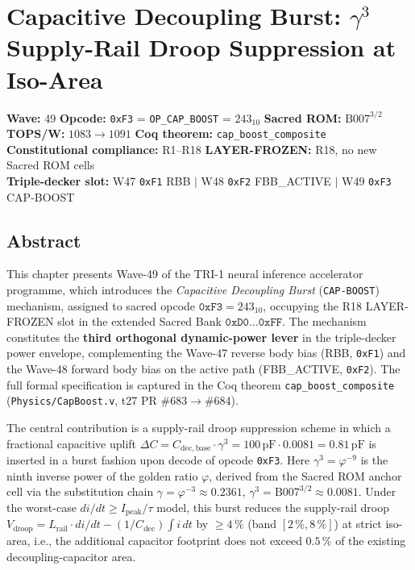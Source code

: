 \documentclass[12pt,a4paper]{report}
\theoremstyle{plain}
\theoremstyle{definition}
\theoremstyle{remark}
\newcommand{\Vdroop}{V_{\mathrm{droop}}}
\newcommand{\Lrail}{L_{\mathrm{rail}}}
\newcommand{\Cdec}{C_{\mathrm{dec}}}
\newcommand{\Cbase}{C_{\mathrm{dec,base}}}
\newcommand{\deltaC}{\Delta C}
\newcommand{\Ipeak}{I_{\mathrm{peak}}}
\newcommand{\Bseven}{\mathrm{B007}}
\begin{document}
\chapter{Capacitive Decoupling Burst: $\gamma^{3}$ Supply-Rail
  Droop Suppression at Iso-Area}
\label{ch:cap-boost-w49}

\noindent\textbf{Wave:} 49 \quad
\textbf{Opcode:} \texttt{0xF3} = \texttt{OP\_CAP\_BOOST} = $243_{10}$\quad
\textbf{Sacred ROM:} $\Bseven^{3/2}$\quad
\textbf{TOPS/W:} $1083 \to 1091$\quad
\textbf{Coq theorem:} \texttt{cap\_boost\_composite}\\[2pt]
\noindent\textbf{Constitutional compliance:} R1--R18 \quad
\textbf{LAYER-FROZEN:} R18, no new Sacred ROM cells\\[2pt]
\noindent\textbf{Triple-decker slot:} W47 \texttt{0xF1} RBB
  $|$ W48 \texttt{0xF2} FBB\_ACTIVE $|$ W49 \texttt{0xF3} CAP-BOOST

\vspace{1em}

\section{Abstract}
\label{sec:abstract-w49}

This chapter presents Wave-49 of the TRI-1 neural inference accelerator
programme, which introduces the \emph{Capacitive Decoupling Burst}
(\texttt{CAP-BOOST}) mechanism, assigned to sacred opcode
$\texttt{0xF3} = 243_{10}$, occupying the R18 LAYER-FROZEN slot in the
extended Sacred Bank $\texttt{0xD0}\ldots\texttt{0xFF}$.
The mechanism constitutes the \textbf{third orthogonal dynamic-power lever}
in the triple-decker power envelope, complementing the Wave-47 reverse body
bias (RBB, \texttt{0xF1}) and the Wave-48 forward body bias on the active
path (FBB\_ACTIVE, \texttt{0xF2}).
The full formal specification is captured in the Coq theorem
\texttt{cap\_boost\_composite} (\texttt{Physics/CapBoost.v}, t27 PR \#683$\to$\#684).

The central contribution is a supply-rail droop suppression scheme in which a
fractional capacitive uplift
$\deltaC = \Cbase \cdot \gamma^{3} = 100\,\mathrm{pF} \cdot 0.0081 = 0.81\,\mathrm{pF}$
is inserted in a burst fashion upon decode of opcode \texttt{0xF3}.
Here $\gamma^{3} = \varphi^{-9}$ is the ninth inverse power of the golden
ratio $\varphi$, derived from the Sacred ROM anchor cell \Bseven{} via the
substitution chain $\gamma = \varphi^{-3} \approx 0.2361$,
$\gamma^{3} = \Bseven^{3/2} \approx 0.0081$.
Under the worst-case $di/dt \geq \Ipeak/\tau$ model, this burst reduces the
supply-rail droop $\Vdroop = \Lrail \cdot di/dt - (1/\Cdec)\int i\,dt$
by $\geq 4\,\%$ (band $[2\,\%, 8\,\%]$) at strict iso-area, i.e., the
additional capacitor footprint does not exceed $0.5\,\%$ of the existing
decoupling-capacitor area.
\end{document}
